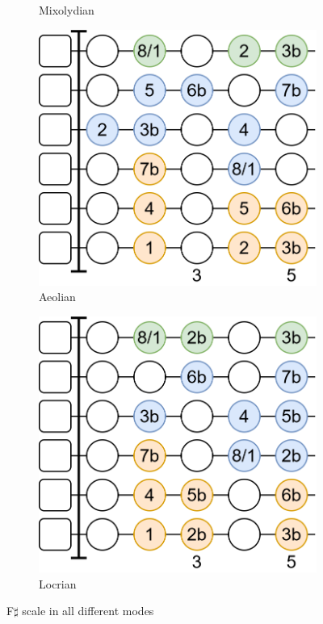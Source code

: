 \begin{figure}[h]
\begin{subfigure}[b]{0.31\textwidth}
		\caption{Mixolydian}
		\label{fig:guitar_mode_shape_mixolydian}
	\end{subfigure}
	\hfill
	\begin{subfigure}[b]{0.31\textwidth}
		\centering
		\includegraphics[height=0.175\textheight]{../../Images/AeolianScaleShape.png}
		\caption{\textnormal{A}eolian}
		\label{fig:guitar_mode_shape_aeolian}
	\end{subfigure}
	
	\vspace{0.5cm}
	
	\begin{subfigure}[b]{0.31\textwidth}
		\centering
		\includegraphics[height=0.175\textheight]{../../Images/LocrianScaleShape.png}
		\caption{Locrian}
		\label{fig:guitar_mode_shape_locrian}
	\end{subfigure}
	
	\caption{F$\sharp$ scale in all different modes}
	\label{fig:guitar_mode_scale_shapes}
\end{figure}

